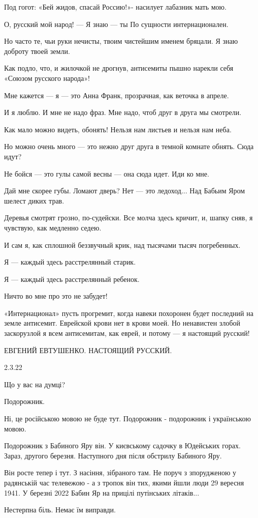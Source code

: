 Под гогот:
«Бей жидов, спасай Россию!»-
насилует лабазник мать мою.

О, русский мой народ! —
Я знаю —
ты
По сущности интернационален.

Но часто те, чьи руки нечисты,
твоим чистейшим именем бряцали.
Я знаю доброту твоей земли.

Как подло,
что, и жилочкой не дрогнув,
антисемиты пышно нарекли
себя «Союзом русского народа»!

Мне кажется —
я — это Анна Франк,
прозрачная,
как веточка в апреле.

И я люблю.
И мне не надо фраз.
Мне надо,
чтоб друг в друга мы смотрели.

Как мало можно видеть,
обонять!
Нельзя нам листьев
и нельзя нам неба.

Но можно очень много —
это нежно
друг друга в темной комнате обнять.
Сюда идут?

Не бойся — это гулы
самой весны —
она сюда идет.
Иди ко мне.

Дай мне скорее губы.
Ломают дверь?
Нет — это ледоход...
Над Бабьим Яром шелест диких трав.

Деревья смотрят грозно,
по-судейски.
Все молча здесь кричит,
и, шапку сняв,
я чувствую,
как медленно седею.

И сам я,
как сплошной беззвучный крик,
над тысячами тысяч погребенных.

Я —
каждый здесь расстрелянный старик.

Я —
каждый здесь расстрелянный ребенок.

Ничто во мне
про это не забудет!

«Интернационал»
пусть прогремит,
когда навеки похоронен будет
последний на земле антисемит.
Еврейской крови нет в крови моей.
Но ненавистен злобой заскорузлой
я всем антисемитам,
как еврей,
и потому —
я настоящий русский!

ЕВГЕНИЙ ЕВТУШЕНКО. НАСТОЯЩИЙ РУССКИЙ.

2.3.22

Що у вас на думці?

Подорожник.

Ні, це російською мовою не буде тут. Подорожник - подорожник і українською мовою. 

Подорожник з Бабиного Яру він. У києвському садочку в Юдейських горах. Зараз,
другого березня. Наступного дня після обстрилу Бабиного Яру.

Він росте тепер і тут. З насіння, зібраного там. Не поруч з зпорудженою у
радянській час телевежою - а з тропок він тих, якими йшли люди 29 вересня 1941.
У березні 2022 Бабин Яр на прицілі путінських літаків...

Нестерпна біль. Немає їм виправди.
